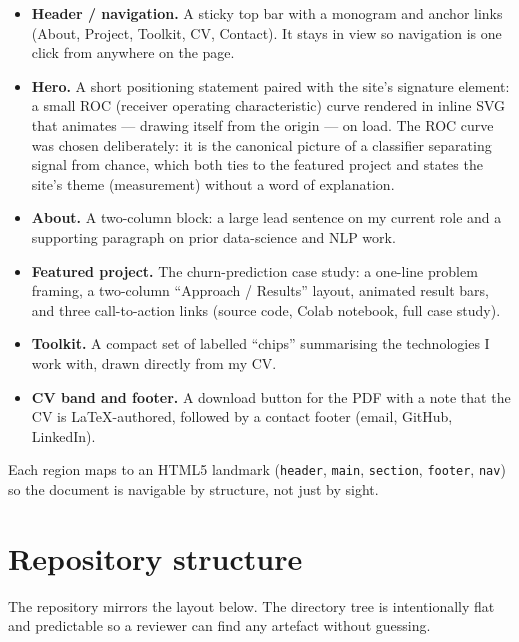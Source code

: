 \documentclass[11pt,a4paper]{article}
\begin{document}
\begin{itemize}
  \item \textbf{Header / navigation.} A sticky top bar with a monogram and
        anchor links (About, Project, Toolkit, CV, Contact). It stays in view so
        navigation is one click from anywhere on the page.
  \item \textbf{Hero.} A short positioning statement paired with the site's
        signature element: a small ROC (receiver operating characteristic) curve
        rendered in inline SVG that animates --- drawing itself from the origin
        --- on load. The ROC curve was chosen deliberately: it is the canonical
        picture of a classifier separating signal from chance, which both ties to
        the featured project and states the site's theme (measurement) without a
        word of explanation.
  \item \textbf{About.} A two-column block: a large lead sentence on my current
        role and a supporting paragraph on prior data-science and NLP work.
  \item \textbf{Featured project.} The churn-prediction case study: a one-line
        problem framing, a two-column ``Approach / Results'' layout, animated
        result bars, and three call-to-action links (source code, Colab notebook,
        full case study).
  \item \textbf{Toolkit.} A compact set of labelled ``chips'' summarising the
        technologies I work with, drawn directly from my CV.
  \item \textbf{CV band and footer.} A download button for the PDF with a note
        that the CV is LaTeX-authored, followed by a contact footer (email,
        GitHub, LinkedIn).
\end{itemize}

Each region maps to an HTML5 landmark (\texttt{header}, \texttt{main},
\texttt{section}, \texttt{footer}, \texttt{nav}) so the document is navigable by
structure, not just by sight.

\section{Repository structure}

The repository mirrors the layout below. The directory tree is intentionally
flat and predictable so a reviewer can find any artefact without guessing.
\end{document}
